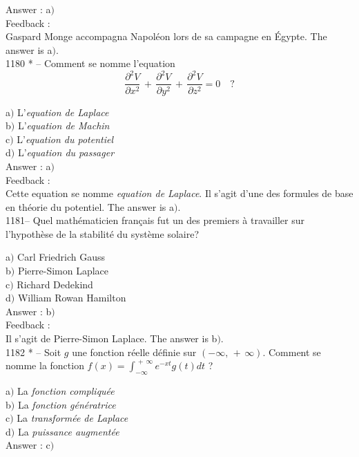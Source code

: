 ﻿\documentclass[letterpaper, 12pt]{article}
\begin{document}
Answer : a$)$\\

Feedback : \\
Gaspard Monge accompagna Napol\'eon lors de sa campagne en \'Egypte.
The answer is a$)$.\\

1180 * -- Comment se nomme l'equation
$$\displaystyle{\frac{\partial^2V}{\partial
x^2}\,+\,\frac{\partial^2V}{\partial y^2}\,+\,\frac{\partial^2V}{\partial
z^2}=0}\quad?$$

a$)$ L'{\sl equation de Laplace} \\
b$)$ L'{\sl equation de Machin} \\
c$)$ L'{\sl equation du potentiel} \\
d$)$ L'{\sl equation du passager}\\


Answer : a$)$\\

Feedback : \\
Cette equation se nomme {\sl equation de Laplace}. Il s'agit
d'une des formules de base en th\'eorie du potentiel.
The answer is a$)$.\\

1181-- Quel math\'ematicien fran\c cais fut un des premiers \`a
travailler sur l'hypoth\`ese de la stabilit\'e du syst\`eme solaire?

a$)$ Carl Friedrich Gauss \\
b$)$ Pierre-Simon Laplace \\
c$)$ Richard Dedekind \\
d$)$ William Rowan Hamilton\\

Answer : b$)$\\

Feedback : \\
Il s'agit de Pierre-Simon Laplace.
The answer is b$)$.\\

1182 * -- Soit $g$ une fonction r\'eelle d\'efinie sur
$(-\infty,\,+\,\infty)$. Comment se nomme la fonction
$f(x)=\int_{-\infty}^{\,+\,\infty}e^{-xt}g(t)dt$ ?

a$)$ La {\sl fonction compliqu\'ee} \\
b$)$ La {\sl fonction g\'en\'eratrice} \\
c$)$ La {\sl transform\'ee de Laplace} \\
d$)$ La {\sl puissance augment\'ee}\\

Answer : c$)$\\
\end{document}
